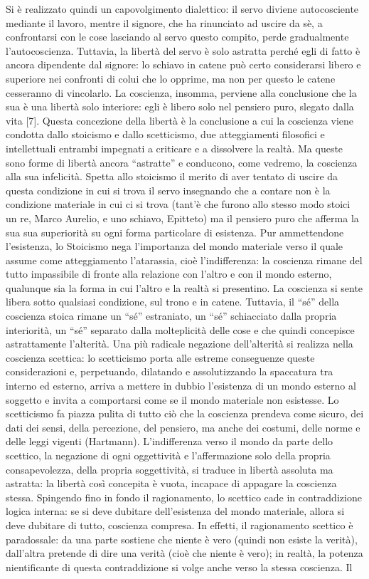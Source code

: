 \documentclass[a4paper,12pt,oneside,openany]{book}%
\begin{document}
Si è realizzato quindi un capovolgimento dialettico: il servo diviene autocosciente mediante il lavoro, mentre il signore, che ha rinunciato ad uscire da sè, a confrontarsi con le cose lasciando al servo questo compito, perde gradualmente l’autocoscienza. Tuttavia, la libertà del servo è solo astratta perché egli di fatto è ancora dipendente dal signore: lo schiavo in catene può certo considerarsi libero e superiore nei confronti di colui che lo opprime, ma non per questo le catene cesseranno di vincolarlo. La coscienza, insomma, perviene alla conclusione che la sua è una libertà solo interiore: egli è libero solo nel pensiero puro, slegato dalla vita [7]. Questa concezione della libertà è la conclusione a cui la coscienza viene condotta dallo stoicismo e dallo scetticismo, due atteggiamenti filosofici e intellettuali entrambi impegnati a criticare e a dissolvere la realtà. Ma queste sono forme di libertà ancora “astratte” e conducono, come vedremo, la coscienza alla sua infelicità. Spetta allo stoicismo il merito di aver tentato di uscire da questa condizione in cui si trova il servo insegnando che a contare non è la condizione materiale in cui ci si trova (tant’è che furono allo stesso modo stoici un re, Marco Aurelio, e uno schiavo, Epitteto) ma il pensiero puro che afferma la sua sua superiorità su ogni forma particolare di esistenza. Pur ammettendone l’esistenza, lo Stoicismo nega l’importanza del mondo materiale verso il quale assume come atteggiamento l’atarassia, cioè l’indifferenza: la coscienza rimane del tutto impassibile di fronte  alla relazione con l’altro e con il mondo esterno, qualunque sia la forma in cui l’altro e la realtà si presentino. La coscienza si sente libera sotto qualsiasi condizione, sul trono e in catene. Tuttavia, il “sé” della coscienza stoica rimane un “sé” estraniato, un “sé” schiacciato dalla propria interiorità, un “sé” separato dalla molteplicità delle cose e che quindi concepisce astrattamente l’alterità. Una più radicale negazione dell’alterità si realizza nella coscienza scettica: lo scetticismo porta alle estreme conseguenze queste considerazioni e, perpetuando, dilatando e assolutizzando la spaccatura tra interno ed esterno, arriva a mettere in dubbio l’esistenza di un mondo esterno al soggetto e invita a comportarsi come se il mondo materiale non esistesse.  Lo scetticismo fa piazza pulita di tutto ciò che la coscienza prendeva come sicuro, dei dati dei sensi, della percezione, del pensiero, ma anche dei costumi, delle norme e delle leggi vigenti (Hartmann). L’indifferenza verso il mondo da parte dello scettico, la negazione di ogni oggettività e l’affermazione solo della propria consapevolezza, della propria soggettività, si traduce in libertà assoluta ma astratta: la libertà così concepita è vuota, incapace di appagare la coscienza stessa. Spingendo fino in fondo il ragionamento, lo scettico cade in contraddizione logica interna: se si deve dubitare dell’esistenza del mondo materiale, allora si deve dubitare di tutto, coscienza compresa. In effetti, il ragionamento scettico è paradossale: da una parte sostiene che niente è vero (quindi non esiste la verità), dall’altra pretende di dire una verità (cioè che niente è vero); in realtà, la potenza nientificante di questa contraddizione si volge anche verso la stessa coscienza. Il 
\end{document}
